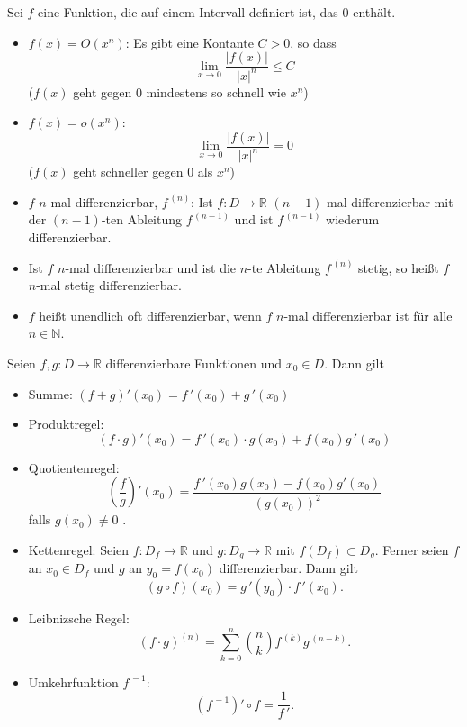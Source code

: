 \documentclass[a4paper,12pt,DIV15]{scrartcl}
\begin{document}
\begin{defn}
Sei $f$ eine Funktion, die auf einem Intervall definiert ist, das $0$
enthält. 
\begin{itemize}
 \item {\color{red} $f(x)=O(x^n)$}: Es gibt eine Kontante $C >0$, so dass
\[  \lim_{x \rightarrow 0} \frac{|f(x)|}{|x|^n} \leq C\]
($f(x)$ geht gegen $0$ mindestens so schnell wie $x^n$)
\item {\color{red} $f(x)=o(x^n)$}: 
\[  
 \lim_{x \rightarrow 0} \frac{|f(x)|}{|x|^n}=0
\]
($f(x)$ geht schneller gegen $0$ als $x^n$)
\end{itemize}
\end{defn}


\begin{defn}
\begin{itemize}
\item {\color{red}$f$ $n$-mal differenzierbar, $f^{\,(n)}$}: Ist $f:D
\rightarrow \mathbb{R}$ $(n-1)$-mal differenzierbar mit der
$(n-1)$-ten Ableitung $f^{\,(n-1)}$ und ist $f^{\,(n-1)}$ wiederum
differenzierbar.
\item Ist $f$ $n$-mal differenzierbar und ist die $n$-te Ableitung $f^{\,(n)}$
stetig, so heißt $f$ $n$-mal {\color{red} stetig differenzierbar}.
\item $f$ heißt {\color{red} unendlich oft differenzierbar}, wenn $f$ $n$-mal
differenzierbar ist für alle $n\in \mathbb{N}$. 
\end{itemize}
\end{defn}




\begin{thm}[Differentationsregeln]
Seien $f,g:D \rightarrow \mathbb{R}$ differenzierbare Funktionen und
$x_0 \in D$. Dann gilt
\begin{itemize}
\item {\color{red}Summe}: $(f+g)'(x_0)=f\,'(x_0)+ g\,'(x_0)$
\item {\color{red}Produktregel}: \[(f \cdot g)'(x_0) = f\,'(x_0) \cdot g(x_0) + f(x_0)g\,'(x_0)\] 
\item {\color{red}Quotientenregel}: \[\left(\frac{f}{g}\right)'(x_0) = \frac{f\,'(x_0) g(x_0) - f(x_0)
g'(x_0)}{(g(x_0))^2}\]
falls $g(x_0) \neq 0$ .
\item {\color{red}Kettenregel}: Seien $f:D_f \rightarrow \mathbb{R}$ und $g:D_g
\rightarrow \mathbb{R}$ mit $f(D_f) \subset D_g$. Ferner seien $f$ an
$x_0 \in D_f$ und $g$ an $y_0=f(x_0)$ differenzierbar. Dann gilt
\[ (g \circ f)(x_0) = g\,'(y_0) \cdot f\,'(x_0).  \]
\item {\color{red}Leibnizsche Regel}:
\[
(f \cdot g)^{(n)} = \sum_{k=0}^n \binom{n}{k} f^{\,(k)} g^{\,(n-k)}.
\]
\item {\color{red}Umkehrfunktion $f^{\,-1}$}:
\[(f^{\,-1})' \circ f = \frac{1}{f\,'}.\]
\end{itemize}
\end{thm}
\end{document}
